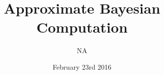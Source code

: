 \titlepage
\title{Approximate Bayesian Computation}
\author{NA}
\date{February 23rd 2016}
\maketitle

